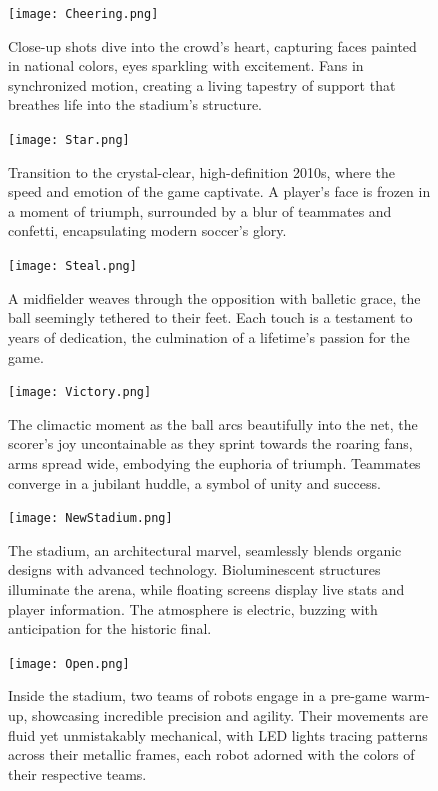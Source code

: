 \documentclass[11pt,a4paper,oneside]{report}
\begin{document}
\begin{figure}[htbp]
  \centering
  \texttt{[image: Cheering.png]}
  \caption{Close-up shots dive into the crowd's heart, capturing faces painted in national colors, eyes sparkling with excitement. Fans in synchronized motion, creating a living tapestry of support that breathes life into the stadium's structure.}
\end{figure}

\begin{figure}[htbp]
  \centering
  \texttt{[image: Star.png]}
  \caption{Transition to the crystal-clear, high-definition 2010s, where the speed and emotion of the game captivate. A player's face is frozen in a moment of triumph, surrounded by a blur of teammates and confetti, encapsulating modern soccer's glory.}
\end{figure}

\begin{figure}[htbp]
  \centering
  \texttt{[image: Steal.png]}
  \caption{A midfielder weaves through the opposition with balletic grace, the ball seemingly tethered to their feet. Each touch is a testament to years of dedication, the culmination of a lifetime's passion for the game.}
\end{figure}

\begin{figure}[htbp]
  \centering
  \texttt{[image: Victory.png]}
  \caption{The climactic moment as the ball arcs beautifully into the net, the scorer's joy uncontainable as they sprint towards the roaring fans, arms spread wide, embodying the euphoria of triumph. Teammates converge in a jubilant huddle, a symbol of unity and success.}
\end{figure}

\begin{figure}[htbp]
  \centering
  \texttt{[image: NewStadium.png]}
  \caption{The stadium, an architectural marvel, seamlessly blends organic designs with advanced technology. Bioluminescent structures illuminate the arena, while floating screens display live stats and player information. The atmosphere is electric, buzzing with anticipation for the historic final.}
\end{figure}

\begin{figure}[htbp]
  \centering
  \texttt{[image: Open.png]}
  \caption{Inside the stadium, two teams of robots engage in a pre-game warm-up, showcasing incredible precision and agility. Their movements are fluid yet unmistakably mechanical, with LED lights tracing patterns across their metallic frames, each robot adorned with the colors of their respective teams.}
\end{figure}
\end{document}
